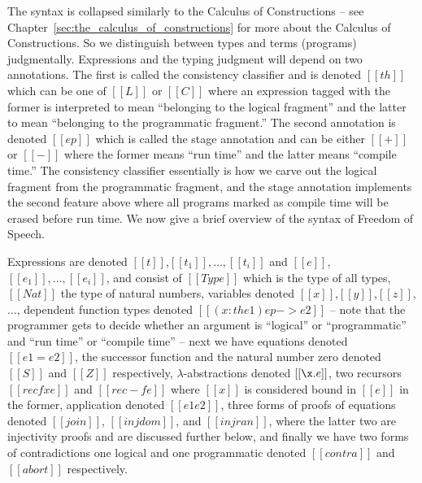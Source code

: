 The syntax is collapsed similarly to the Calculus of Constructions --
see Chapter~\ref{sec:the_calculus_of_constructions} for more about the
Calculus of Constructions. So we distinguish between types and terms
(programs) judgmentally.  Expressions and the typing judgment will
depend on two annotations.  The first is called the consistency
classifier and is denoted $[[th]]$ which can be one of $[[L]]$ or
$[[C]]$ where an expression tagged with the former is interpreted to
mean ``belonging to the logical fragment'' and the latter to mean
``belonging to the programmatic fragment.''  The second annotation is
denoted $[[ep]]$ which is called the stage annotation and can be
either $[[+]]$ or $[[-]]$ where the former means ``run time'' and the
latter means ``compile time.'' The consistency classifier essentially
is how we carve out the logical fragment from the programmatic
fragment, and the stage annotation implements the second feature above
where all programs marked as compile time will be erased before run
time.  We now give a brief overview of the syntax of Freedom of
Speech.

Expressions are denoted $[[t]]$,$[[t_1]],\ldots,[[t_i]]$ and
$[[e]]$,$[[e_1]],\ldots,[[e_i]]$, and consist of
$[[Type]]$ which is the type of all types, $[[Nat]]$ the type of
natural numbers, variables denoted $[[x]]$,$[[y]]$,$[[z]]$, $\ldots$,
dependent function types denoted $[[(x : th e1) ep -> e2]]$ -- note that
the programmer gets to decide whether an argument is ``logical'' or
``programmatic'' and ``run time'' or ``compile time'' -- next we have
equations denoted $[[e1 = e2]]$, the successor function and the
natural number zero denoted $[[S]]$ and $[[Z]]$ respectively,
$\lambda$-abstractions denoted $[[\x.e]]$, two recursors $[[rec f x
e]]$ and $[[rec - f e]]$ where $[[x]]$ is considered bound in $[[e]]$
in the former, application denoted $[[e1 e2]]$, three forms of proofs
of equations denoted $[[join]]$, $[[injdom]]$, and $[[injran]]$, where
the latter two are injectivity proofs and are discussed further below,
and finally we have two forms of contradictions one logical and one
programmatic denoted $[[contra]]$ and $[[abort]]$ respectively.

